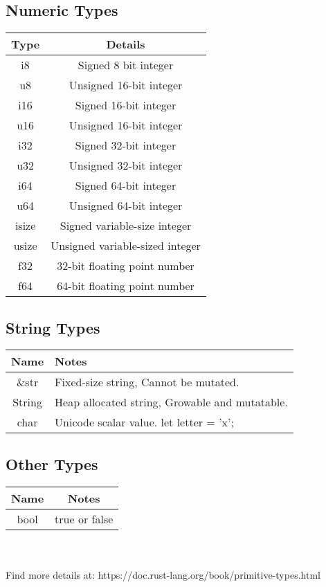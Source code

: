 \documentclass[letterpaper,landscape]{article}
\begin{document}
\begin{multicols}{3}
\subsection*{Numeric Types}
\begin{tabular}{ c|c }
  Type & Details \\
  \hline
    \color{BrickRed}i8 & \color{black}Signed 8 bit integer \\
    \color{BrickRed}u8 & Unsigned 16-bit integer\\
    \color{BrickRed}i16 & Signed 16-bit integer\\
    \color{BrickRed}u16 & Unsigned 16-bit integer\\
    \color{BrickRed}i32 & Signed 32-bit integer \\
    \color{BrickRed}u32 & Unsigned 32-bit integer \\
    \color{BrickRed}i64 & Signed 64-bit integer \\
    \color{BrickRed}u64 & Unsigned 64-bit integer \\
    \hline\hline
    \color{BrickRed}isize & Signed variable-size integer \\ \color{BrickRed}usize & Unsigned variable-sized integer \\
    \hline\hline
    \color{BrickRed}f32 & 32-bit floating point number \\
    \color{BrickRed}f64 & 64-bit floating point number\\
\end{tabular}

\subsection*{String Types}
\begin{tabular}{ c|L }
  Name & Notes \\
  \hline
  \color{BrickRed}\&str & Fixed-size string, Cannot be mutated. \\
  \color{BrickRed}String & Heap allocated string, Growable and mutatable.\\
  \color{BrickRed}char & Unicode scalar value. let letter = 'x';\\
\end{tabular}

\subsection*{Other Types}
\begin{tabular}{ c|c }
  Name & Notes \\
  \hline
  \color{BrickRed}bool & true or false \\
\end{tabular}
\\\\
Find more details at: https://doc.rust-lang.org/book/primitive-types.html


\end{multicols}
\end{document}
